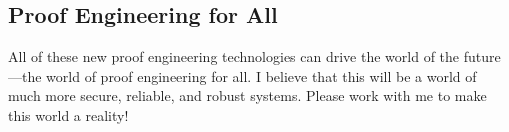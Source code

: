 
\subsection*{Proof Engineering for All}

All of these new proof engineering technologies can drive the world of the future---the world of proof engineering for all.
I believe that this will be a world of much more secure, reliable, and robust systems.
Please work with me to make this world a reality!

